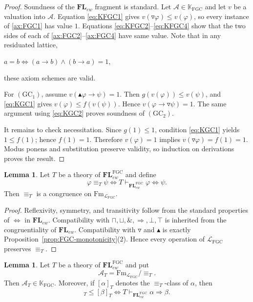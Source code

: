 \documentclass[final,12pt,times]{elsarticle}
\theoremstyle{plain}
\theoremstyle{definition}
\newtheorem{lemma}[definition]{Lemma}
\theoremstyle{break}
\begin{document}
\begin{proof}
Soundness of the $\mathbf{FL}_{ew}$ fragment is standard.  Let
$\mathscr{A}\in\mathbb K_{\mathrm{FGC}}$ and let $v$ be a valuation into
$\mathscr{A}$.  Equation \eqref{eq:KFGC1} gives
$v(\triangledown\varphi)\le v(\varphi)$, so every instance of
\eqref{ax:FGC1} has value $1$.  Equations
\eqref{eq:KFGC2}--\eqref{eq:KFGC4} show that the two sides of each of
\eqref{ax:FGC2}--\eqref{ax:FGC4} have same value.   Note that in any residuated lattice,
\begin{center} $a=b  \Longleftrightarrow
(a\to b)\wedge(b\to a)=1$, 
\end{center}
these axiom schemes are valid.

For $(\mathrm{GC}_1)$, assume
$v(\blacktriangle\varphi\to\psi)=1$.  Then
$g(v(\varphi))\le v(\psi)$, and \eqref{eq:KGC1} gives
$v(\varphi)\le f(v(\psi))$.  Hence
$v(\varphi\to\triangledown\psi)=1$.  The same argument using
\eqref{eq:KGC2} proves soundness of $(\mathrm{GC}_2)$.

It remains to check necessitation.  Since $g(1)\le1$, condition
\eqref{eq:KGC1} yields $1\le f(1)$; hence $f(1)=1$.  Therefore
$v(\varphi)=1$ implies
$v(\triangledown\varphi)=f(1)=1$.  Modus ponens and substitution preserve
validity, so induction on derivations proves the result.
\end{proof}

\begin{lemma}\label{lem:FGC-Lindenbaum-congruence}
Let $T$ be a theory of $\mathbf{FL}^{\mathrm{FGC}}_{ew}$ and define
\[
 \varphi\equiv_T\psi
 \Longleftrightarrow
 T\vdash_{\mathbf{FL}^{\mathrm{FGC}}_{ew}}
   \varphi\Leftrightarrow\psi.
\]
Then $\equiv_T$ is a congruence on
$\mathrm{Fm}_{\mathcal L_{\mathrm{FGC}}}$.
\end{lemma}

\begin{proof}
Reflexivity, symmetry, and transitivity follow from the standard properties of
$\Leftrightarrow$ in $\mathbf{FL}_{ew}$.  Compatibility with
$\sqcap,\sqcup,\&,\Rightarrow,\bot,\top$ is inherited from the congruentiality of $\mathbf{FL}_{ew}$.  Compatibility with $\triangledown$ and $\blacktriangle$ is exactly
Proposition~\ref{prop:FGC-monotonicity}(2).  Hence every operation
of $\mathcal L_{\mathrm{FGC}}$ preserves $\equiv_T$.
\end{proof}

\begin{lemma}\label{lem:FGC-canonical-algebra}
Let $T$ be a theory of $\mathbf{FL}^{\mathrm{FGC}}_{ew}$ and put
\[
 \mathscr{A}_T
   =\mathrm{Fm}_{\mathcal L_{\mathrm{FGC}}}/\!\equiv_T.
\]
Then $\mathscr{A}_T\in\mathbb K_{\mathrm{FGC}}$.  Moreover, if
$[\alpha]_T$ denotes the $\equiv_T$-class of $\alpha$, then
\begin{equation}
 [\alpha]_T\le[\beta]_T
 \Longleftrightarrow
 T\vdash_{\mathbf{FL}^{\mathrm{FGC}}_{ew}}\alpha\Rightarrow\beta.
 \label{eq:canonical-order}
\end{equation}
\end{lemma}
\end{document}
